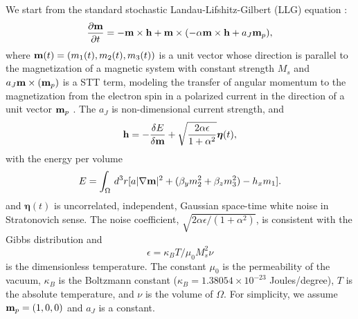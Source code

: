\documentclass[journal,transmag]{IEEEtran}
\begin{document}
We start from the standard stochastic Landau-Lifshitz-Gilbert (LLG) equation \cite{GaraCervera2007NumericalMA} :
\begin{equation}
\frac{\partial{\bf{m}}}{\partial t} = - {\bf{m}}\times{\bf{h}} + {\bf{m}}\times(-\alpha{\bf{m}}\times{\bf{h}} + a_J {\bf{m}}_p),
\label{eq:LLG}
\end{equation}
where ${\bf{m}}(t) = (m_1(t),m_2(t),m_3(t))$ is a unit vector whose direction is parallel to the magnetization of a magnetic system with constant strength $M_s$ and $a_J  {\bf{m}}\times( {\bf{m}}_p)$ is a STT term, modeling the transfer of angular momentum to the magnetization from the electron spin in a polarized current in the direction of a unit vector ${\bf{m}}_p$  \cite{Newhall_Eric}. The $a_J$ is  non-dimensional current strength, and  \begin{align}
{\bf{h}} = -\frac{\delta E}{\delta {\bf{m}}} + \sqrt{\frac{2\alpha \epsilon}{1+\alpha^2}}\boldsymbol{\eta}(t),
\end{align}
with the energy per volume
\begin{align}
E = \int_{\Omega}\,d^3r [a|\nabla{\bf{m}}|^2 + (\beta_y m_2^2+\beta_z m_3^2) - h_x m_1].
\label{E:nonuniform}
\end{align}
and
$\boldsymbol{\eta}(t)$ is uncorrelated, independent, Gaussian space-time white noise in Stratonovich sense.
The noise coefficient, $\sqrt{{2\alpha \epsilon}/(1+\alpha^2)}$, is consistent with the Gibbs distribution and
$$
\epsilon = \kappa_B T/\mu_0 M_s^2\nu
$$
is the dimensionless temperature. The constant $\mu_0$ is the permeability of the vacuum, $\kappa_B$ is the Boltzmann constant ($\kappa_B = 1.38054 \times 10^{-23}$ Joules/degree), $T$ is the absolute temperature, and $\nu$ is the volume of $\Omega$.
For simplicity, we assume ${\bf{m}}_p = (1,0,0)$ and  $a_J$ is a constant.
\end{document}
